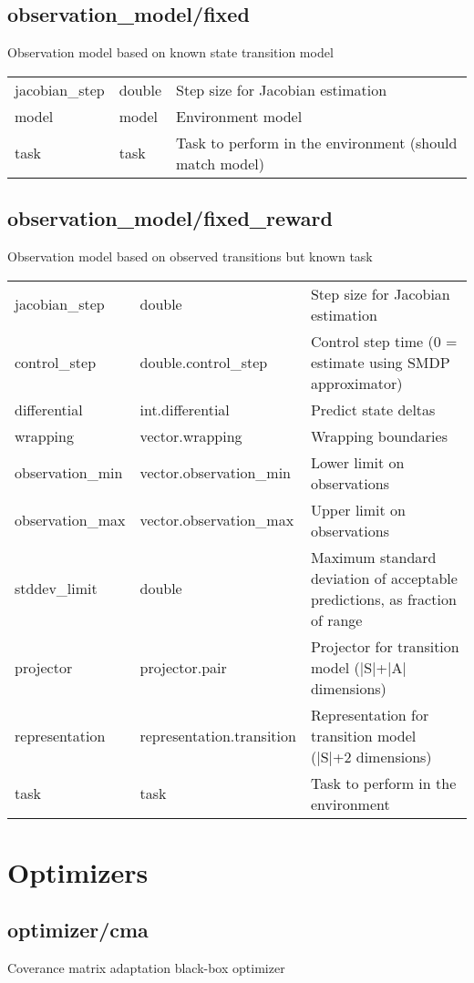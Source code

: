 \subsection{observation\_model/fixed}
\noindent Observation model based on known state transition model\\

\noindent\begin{tabular}{@{}lll@{}}
jacobian\_step&double&Step size for Jacobian estimation\\
model&model&Environment model\\
task&task&Task to perform in the environment (should match model)\\
\end{tabular}
\subsection{observation\_model/fixed\_reward}
\noindent Observation model based on observed transitions but known task\\

\noindent\begin{tabular}{@{}lll@{}}
jacobian\_step&double&Step size for Jacobian estimation\\
control\_step&double.control\_step&Control step time (0 = estimate using SMDP approximator)\\
differential&int.differential&Predict state deltas\\
wrapping&vector.wrapping&Wrapping boundaries\\
observation\_min&vector.observation\_min&Lower limit on observations\\
observation\_max&vector.observation\_max&Upper limit on observations\\
stddev\_limit&double&Maximum standard deviation of acceptable predictions, as fraction of range\\
projector&projector.pair&Projector for transition model (|S|+|A| dimensions)\\
representation&representation.transition&Representation for transition model (|S|+2 dimensions)\\
task&task&Task to perform in the environment\\
\end{tabular}
\section{Optimizers}
\subsection{optimizer/cma}
\noindent Coverance matrix adaptation black-box optimizer\\

